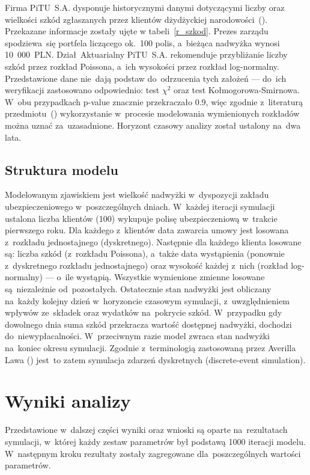 \documentclass[12pt, a4paper, oneside]{mwart} %
\begin{document}
Firma PiTU~S.A. dysponuje historycznymi danymi dotyczącymi liczby oraz wielkości szkód zgłaszanych przez klientów dżydżyckiej narodowości~(\cite{case}). Przekazane informacje zostały ujęte w tabeli~\ref{r_szkod}. Prezes zarządu spodziewa~się portfela liczącego ok.~100 polis, a~bieżąca nadwyżka wynosi 10~000~PLN. Dział~Aktuarialny PiTU~S.A. rekomenduje przybliżanie liczby szkód przez rozkład Poissona, a~ich wysokości przez rozkład log-normalny. Przedstawione dane nie~dają podstaw do~odrzucenia tych założeń --- do~ich weryfikacji zastosowano odpowiednio: test $\chi^2$ oraz test Kołmogorowa-Smirnowa. W~obu przypadkach p-value znacznie przekraczało 0.9, więc zgodnie z~literaturą przedmiotu~(\cite{mielczarek}) wykorzystanie w~procesie modelowania wymienionych rozkładów można uznać za~uzasadnione. Horyzont czasowy analizy został ustalony na~dwa lata.

\subsection{Struktura modelu}
Modelowanym zjawiskiem jest wielkość nadwyżki w~dyspozycji zakładu ubezpieczeniowego w~poszczególnych dniach. W~każdej iteracji symulacji ustalona liczba klientów (100) wykupuje polisę ubezpieczeniową w~trakcie pierwszego roku. Dla każdego z~klientów data zawarcia umowy jest losowana z~rozkładu jednostajnego (dyskretnego). Następnie dla każdego klienta losowane są: liczba szkód (z~rozkładu Poissona), a~także data wystąpienia (ponownie z~dyskretnego rozkładu jednostajnego) oraz wysokość każdej z~nich (rozkład log-normalny) --- o~ile wystąpią. Wszystkie wymienione zmienne losowane są~niezależnie od~pozostałych. Ostatecznie stan nadwyżki jest obliczany na~każdy kolejny dzień w~horyzoncie czasowym symulacji, z~uwzględnieniem wpływów ze~składek oraz wydatków na~pokrycie szkód. W~przypadku gdy dowolnego dnia suma szkód przekracza wartość dostępnej nadwyżki, dochodzi do~niewypłacalności. W~przeciwnym razie model zwraca stan nadwyżki na~koniec okresu symulacji. Zgodnie z~terminologią zastosowaną przez Averilla Lawa (\cite{law}) jest~to zatem symulacja zdarzeń dyskretnych (discrete-event simulation).

\section{Wyniki analizy}
Przedstawione w~dalszej części wyniki oraz wnioski są oparte na~rezultatach symulacji, w~której każdy zestaw parametrów był podstawą 1000 iteracji modelu. W~następnym kroku rezultaty zostały zagregowane dla~poszczególnych wartości parametrów.
\end{document}
